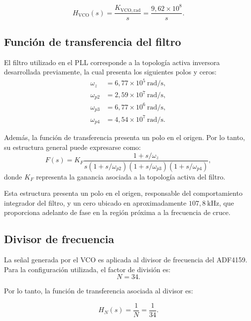 \begin{equation}
H_{\mathrm{VCO}}(s) = \frac{K_{\mathrm{VCO,rad}}}{s} = \frac{9{,}62\times10^8}{s}.
\end{equation}

\subsection*{Función de transferencia del filtro}
El filtro utilizado en el PLL corresponde a la topología activa inversora desarrollada previamente, la cual presenta los siguientes polos y ceros:
\begin{align}
\omega_z &= 6{,}77\times10^5~\mathrm{rad/s}, \\
\omega_{p2} &= 2{,}59\times10^7~\mathrm{rad/s}, \\
\omega_{p3} &= 6{,}77\times10^6~\mathrm{rad/s}, \\
\omega_{p4} &= 4{,}54\times10^7~\mathrm{rad/s}.
\end{align}

Además, la función de transferencia presenta un polo en el origen. Por lo tanto, su estructura general puede expresarse como:
\begin{equation}
F(s) = K_F \frac{1 + s/\omega_z}{s \left(1 + s/\omega_{p2}\right) \left(1 + s/\omega_{p3}\right) \left(1 + s/\omega_{p4}\right)},
\end{equation}
donde $K_F$ representa la ganancia asociada a la topología activa del filtro.

Esta estructura presenta un polo en el origen, responsable del comportamiento integrador del filtro, y un cero ubicado en aproximadamente $107{,}8~\mathrm{kHz}$, que proporciona adelanto de fase en la región próxima a la frecuencia de cruce.

\subsection*{Divisor de frecuencia}
La señal generada por el VCO es aplicada al divisor de frecuencia del ADF4159. Para la configuración utilizada, el factor de división es:
\begin{equation}
N = 34.
\end{equation}

Por lo tanto, la función de transferencia asociada al divisor es:

\begin{equation}
H_N(s) = \frac{1}{N} = \frac{1}{34}.
\end{equation}

